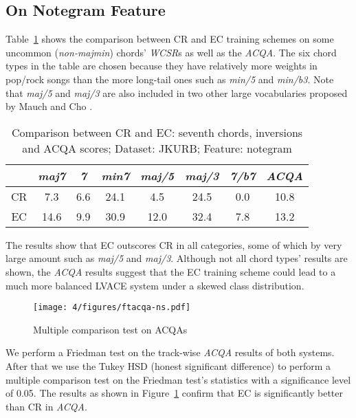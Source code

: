 \subsection{On Notegram Feature}
Table~\ref{tab:4-acqa-ns} shows the comparison between CR and EC training schemes on some uncommon (\textit{non-majmin}) \cite{burgoyne2011expert} chords' \textit{WCSR}s as well as the \textit{ACQA}. The six chord types in the table are chosen because they have relatively more weights in pop/rock songs than the more long-tail ones such as \textit{min/5} and \textit{min/b3}. Note that \textit{maj/5} and \textit{maj/3} are also included in two other large vocabularies proposed by Mauch \cite{mauch2010automatic} and Cho \cite{cho2014improved}.
\begin{table}[htb]
	\caption{Comparison between CR and EC: seventh chords, inversions and ACQA scores; Dataset: JKURB; Feature: notegram}
	\centering
	\scriptsize
	\begin{tabular}{|c|c|c|c|c|c|c|c|} \hline
		& \textit{maj7} & \textit{7} & \textit{min7} & \textit{maj/5} & \textit{maj/3} & \textit{7/b7} & \textit{ACQA} \\ \hline
		CR & 7.3 & 6.6 & 24.1 & 4.5 & 24.5 & 0.0 & 10.8 \\ \hline
		EC &  14.6 & 9.9 & 30.9 & 12.0 & 32.4 & 7.8 & 13.2 \\ \hline
	\end{tabular}
	\label{tab:4-acqa-ns}
\end{table}

The results show that EC outscores CR in all categories, some of which by very large amount such as \textit{maj/5} and \textit{maj/3}. Although not all chord types' results are shown, the \textit{ACQA} results suggest that the EC training scheme could lead to a much more balanced LVACE system under a skewed class distribution.

\begin{figure}[htb]
	\centering
	\texttt{[image: 4/figures/ftacqa-ns.pdf]}
	\caption{Multiple comparison test on ACQAs}
	\label{fig:4-ftacqa-ns}
\end{figure}
We perform a Friedman test on the track-wise \textit{ACQA} results of both systems. After that we use the Tukey HSD (honest significant difference) to perform a multiple comparison test on the Friedman test's statistics with a significance level of 0.05. The results as shown in Figure~\ref{fig:4-ftacqa-ns} confirm that EC is significantly better than CR in \textit{ACQA}.

